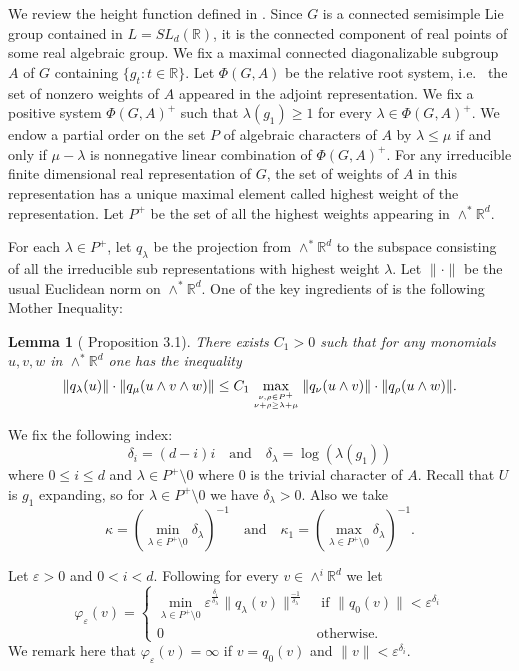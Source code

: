 \documentclass[12pt]{amsart}
\newtheorem{lem}[thm]{Lemma}
\theoremstyle{definition}
\theoremstyle{remark}
\numberwithin{equation}{section}
\begin{document}
We review the height function defined in \cite{bq12}.  Since $G$ is a 
connected  semisimple Lie group contained in $L=SL_d(\mathbb R)$, 
it is the connected component of  real points of some real algebraic group.  
We fix a maximal connected diagonalizable  subgroup 
$A$ of $G$ containing $\{g_t: t\in \mathbb R\}$. Let $\Phi(G, A) $ be the 
 relative root system, i.e.~ the set of 
nonzero  weights   of $A$
appeared in the adjoint representation.
We fix a positive system $\Phi(G, A) ^+$ such that $\lambda (g_1)\ge 1$ for 
every $\lambda\in \Phi(G, A) ^+$.  
We endow a partial order on the set $P$ of algebraic characters  of  $A$ by 
$
\lambda \le \mu$  
if and only if 
$ \mu-\lambda$ 
 is  nonnegative linear combination  of  $\Phi(G, A) ^+$.
 For any   irreducible finite dimensional real 
representation of $G$,
the set of weights of $A$ in this representation 
 has a unique maximal element called
 highest weight of the representation. 
Let $P^+$ be the set of all the highest weights appearing in $\wedge^*\mathbb R^d$.

 For each $\lambda\in P^+$, let $q_\lambda$ be the projection 
from $\wedge^* \mathbb R^d$ to the subspace consisting of all the irreducible sub representations with
highest weight $\lambda$. 
Let  $\|\cdot\|$ be the usual Euclidean norm on $\wedge^*\mathbb R^d $.
One of the key ingredients of \cite{bq12} is the following Mother Inequality:
\begin{lem}[\cite{bq12} Proposition 3.1]\label{lem;mo}
There exists $C_1>0$ such that for any monomials $u, v, w$ in $\wedge ^*\mathbb R^d$
one has the inequality 
\[
\|q_\lambda(u)\|\cdot \|q_\mu(u\wedge v\wedge w)\|\le C_1 \max_{\nu, \rho\in P^+ \atop 
\nu+\rho\ge \lambda +\mu} \|q_\nu(u\wedge v)\|\cdot
\|q_\rho(u\wedge w)\|.
\]
\end{lem}

We fix the following index:
\[
\delta_i=(d-i)i \quad\mbox{and}\quad \delta_\lambda= \log( \lambda( g_1))
\]
where $0\le i\le d$ and $\lambda\in P^+\setminus 0$ where $0$ is the trivial  character of $A$. Recall that
$U$ is $ g_1 $ expanding, so for
 $\lambda \in P^+\setminus 0$  we have
$\delta_\lambda>0$.
 Also we take
\begin{equation}\label{eq;kappa}
\kappa=(\min_{\lambda\in P^+\setminus 0} \delta_\lambda)^{-1}
\quad\mbox{and}\quad \kappa_1=(\max_{\lambda\in P^+\setminus 0} \delta_\lambda)^{-1}.
\end{equation}

Let $\varepsilon>0$ and $0<i< d$. 
Following \cite{bq12}
for every  
$v\in \wedge^i \mathbb R^d$  we let
\[
\varphi_{ \varepsilon }(v)=\left\{
\begin{array}{ll}
\min _{\lambda\in P^+\setminus 0}  \varepsilon ^{\frac{\delta _i}
{\delta _\lambda}}\|q_\lambda(v)\|^{\frac{-1}{\delta _\lambda}} & \mbox{ if }
\|q_0(v)\|<\varepsilon ^{\delta _i}\\
0 & \mbox{otherwise.}
\end{array}
\right.
\]
We remark here 
that  $\varphi_{ \varepsilon }(v)=\infty $
 if
 $v=q_0(v)$ and $\|v\|<  \varepsilon ^{\delta _i}$. 
\end{document}
